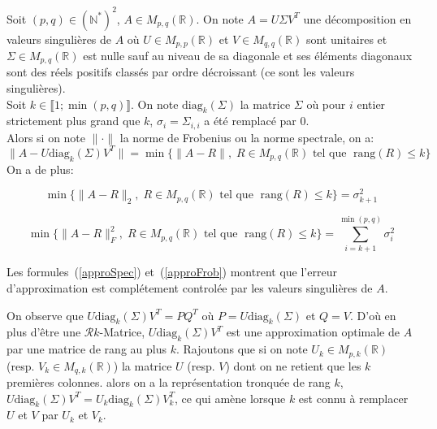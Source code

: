 \begin{theorem}
  Soit $(p,q) \in (\mathbb{N}^{*})^2$, $A \in M_{p,q}(\mathbb{R})$. On
  note $A = U\Sigma V^{T}$ une décomposition en valeurs singulières de $A$ où
  $U \in M_{p,p}(\mathbb{R})$ et $V \in M_{q,q}(\mathbb{R})$ sont unitaires
  et $\Sigma \in M_{p,q}(\mathbb{R})$ est nulle sauf au niveau de sa diagonale
  et ses éléments diagonaux sont des réels positifs classés par ordre
  décroissant (ce sont les valeurs singulières).\\

  \noindent Soit $k \in \llbracket 1;\min(p,q) \rrbracket$. On note
  $\mathrm{diag}_{k}(\Sigma)$ la matrice $\Sigma$ où pour
  $i$ entier strictement plus grand que $k$,
  $\sigma_{i}=\Sigma_{i,i}$ a été remplacé par $0$.\\
  Alors si on note $\|\cdot\|$ la norme de Frobenius ou la norme spectrale,
  on a:
\begin{equation*}
\|A - U\mathrm{diag}_{k}(\Sigma)V^{T}\| = \min \{ \|A - R\|, \; R \in M_{p,q}(\mathbb{R}) \text{ tel que }\; \mathrm{rang}(R) \leq k \}
\end{equation*}
\noindent On a de plus:

\begin{equation}
  \label{approSpec}
\min \{ \|A - R\|_{2}, \; R \in M_{p,q}(\mathbb{R}) \text{ tel que }\; \mathrm{rang}(R) \leq k \} = \sigma_{k+1}^2
\end{equation}

\begin{equation}
  \label{approFrob}
\min \biggl \{ \|A - R\|_{F}^2, \; R \in M_{p,q}(\mathbb{R}) \text{ tel que }\; \mathrm{rang}(R) \leq k \biggr \} = \displaystyle\sum_{i=k+1}^{\min(p,q)} \sigma_{i}^2
\end{equation}
\end{theorem}


\begin{remark}
Les formules~(\ref{approSpec}) et~(\ref{approFrob}) montrent que
l'erreur d'approximation est complétement controlée par les valeurs singulières de $A$.
\end{remark}

\begin{remark}
On observe que $U\mathrm{diag}_{k}(\Sigma)V^{T}=PQ^{T}$ où $P=U\mathrm{diag}_{k}(\Sigma)$ et $Q=V$. D'où en plus d'être une $\mathcal{R}k$-Matrice,
$U\mathrm{diag}_{k}(\Sigma)V^{T}$ est une approximation optimale de $A$ par une matrice de rang au plus $k$.
Rajoutons que si on note $U_k \in M_{p,k}(\mathbb{R})$ (resp. $V_k \in M_{q,k}(\mathbb{R})$) la
matrice $U$ (resp. $V$) dont on ne retient que les $k$ premières colonnes. alors on a la représentation tronquée de rang $k$,
$U\mathrm{diag}_{k}(\Sigma)V^{T}= U_k\mathrm{diag}_{k}(\Sigma)V_{k}^{T} $, ce qui amène lorsque $k$ est connu à remplacer $U$ et $V$ par $U_k$ et $V_k$.\\
\end{remark}

